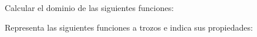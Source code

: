\documentclass[spanish, 11pt]{exam}
\begin{document}
\begin{questions}

\question Calcular el dominio de las siguientes funciones:
\begin{multicols}{2}
\end{multicols}

\question Representa las siguientes funciones a trozos e indica sus propiedades:\begin{parts} 

\end{parts}
\end{questions}
\end{document}
